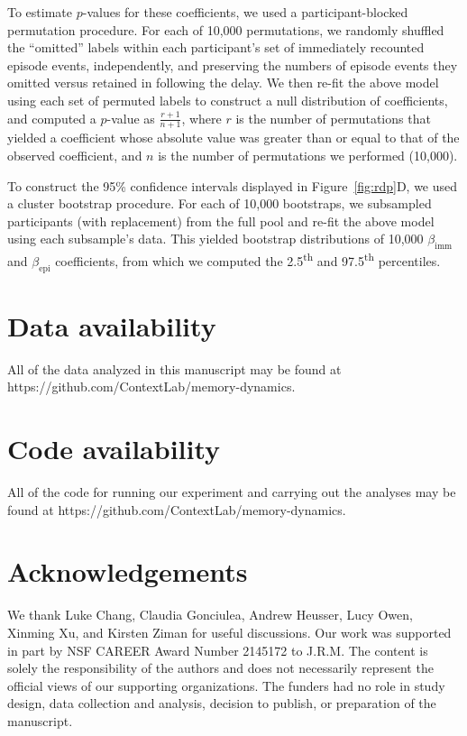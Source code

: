 \documentclass[10pt]{article}
\begin{document}
To estimate $p$-values for these coefficients, we used a participant-blocked permutation procedure.
For each of 10,000 permutations, we randomly shuffled the ``omitted'' labels within each participant's set of immediately recounted episode events, independently, and preserving the numbers of episode events they omitted versus retained in following the delay.
We then re-fit the above model using each set of permuted labels to construct a null distribution of coefficients, and computed a $p$-value as $\frac{r+1}{n+1}$, where $r$ is the number of permutations that yielded a coefficient whose absolute value was greater than or equal to that of the observed coefficient, and $n$ is the number of permutations we performed (10,000).

To construct the 95\% confidence intervals displayed in Figure~\ref{fig:rdp}D, we used a cluster bootstrap procedure.
For each of 10,000 bootstraps, we subsampled participants (with replacement) from the full pool and re-fit the above model using each subsample's data. 
This yielded bootstrap distributions of 10,000 $\beta_{\text{imm}}$ and $\beta_{\text{epi}}$ coefficients, from which we computed the 2.5\textsuperscript{th} and 97.5\textsuperscript{th} percentiles.


\section*{Data availability}

All of the data analyzed in this manuscript may be found at
https://github.com/Con\-text\-Lab/memory-dynamics.


\section*{Code availability}

All of the code for running our experiment and carrying out the analyses may be
found at https://github.com/Con\-text\-Lab/memory-dynamics.






\section*{Acknowledgements}

We thank Luke Chang, Claudia Gonciulea, Andrew Heusser, Lucy Owen, Xinming Xu, and Kirsten Ziman for useful discussions.
Our work was supported in part by NSF CAREER Award Number 2145172 to J.R.M.
The content is solely the responsibility of the authors and does not necessarily represent the official views of our supporting organizations.
The funders had no role in study design, data collection and analysis, decision to publish, or preparation of the manuscript.
\end{document}
